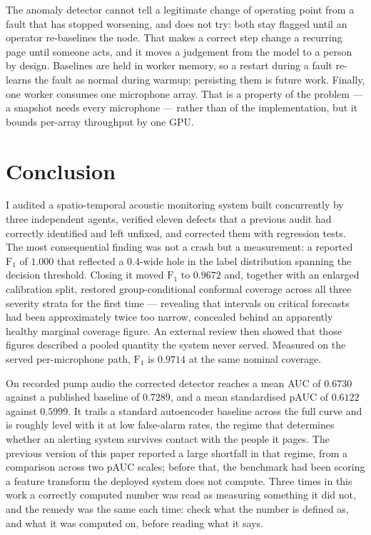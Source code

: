 \documentclass[11pt]{article}
\let\oldsection\section
\renewcommand{\section}{\clearpage\oldsection}
\begin{document}
The anomaly detector cannot tell a legitimate change of operating point from a
fault that has stopped worsening, and does not try: both stay flagged until an
operator re-baselines the node. That makes a correct step change a recurring
page until someone acts, and it moves a judgement from the model to a person by
design. Baselines are held in worker memory, so a restart during a fault
re-learns the fault as normal during warmup; persisting them is future work.
Finally, one worker consumes one microphone array. That is a property of the
problem --- a snapshot needs every microphone --- rather than of the
implementation, but it bounds per-array throughput by one GPU.

\section{Conclusion}

I audited a spatio-temporal acoustic monitoring system built concurrently by
three independent agents, verified eleven defects that a previous audit had
correctly identified and left unfixed, and corrected them with regression tests.
The most consequential finding was not a crash but a measurement: a reported
$\mathrm{F}_1$ of $1.000$ that reflected a $0.4$-wide hole in the label
distribution spanning the decision threshold. Closing it moved $\mathrm{F}_1$ to
$0.9672$ and, together with an enlarged calibration split, restored
group-conditional conformal coverage across all three severity strata for the
first time --- revealing that intervals on critical forecasts had been
approximately twice too narrow, concealed behind an apparently healthy marginal
coverage figure. An external review then showed that those figures described a
pooled quantity the system never served. Measured on the served per-microphone
path, $\mathrm{F}_1$ is $0.9714$ at the same nominal coverage.

On recorded pump audio the corrected detector reaches a mean AUC of $0.6730$
against a published baseline of $0.7289$, and a mean standardised pAUC of
$0.6122$ against $0.5999$. It trails a standard autoencoder baseline across the
full curve and is roughly level with it at low false-alarm rates, the regime
that determines whether an alerting system survives contact with the people it
pages. The previous version of this paper reported a large shortfall in that
regime, from a comparison across two pAUC scales; before that, the benchmark
had been scoring a feature transform the deployed system does not compute.
Three times in this work a correctly computed number was read as measuring
something it did not, and the remedy was the same each time: check what the
number is defined as, and what it was computed on, before reading what it says.
\end{document}
